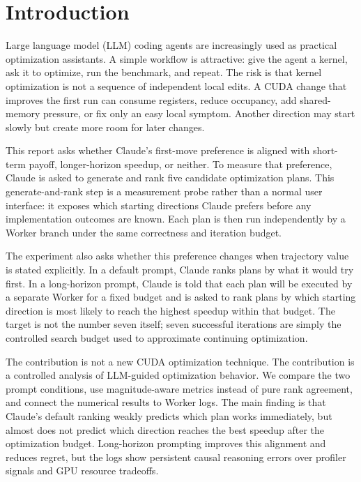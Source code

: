 \documentclass[conference]{IEEEtran}
\begin{document}
\vspace{0.5em}
\noindent{}

\section{Introduction}

Large language model (LLM) coding agents are increasingly used as practical
optimization assistants. A simple workflow is attractive: give the agent a
kernel, ask it to optimize, run the benchmark, and repeat. The risk is that
kernel optimization is not a sequence of independent local edits. A CUDA
change that improves the first run can consume registers, reduce occupancy,
add shared-memory pressure, or fix only an easy local symptom. Another
direction may start slowly but create more room for later changes.

This report asks whether Claude's first-move preference is aligned with
short-term payoff, longer-horizon speedup, or neither. To measure that
preference, Claude is asked to generate and rank five candidate optimization
plans. This generate-and-rank step is a measurement probe rather than a normal
user interface: it exposes which starting directions Claude prefers before any
implementation outcomes are known. Each plan is then run independently by a
Worker branch under the same correctness and iteration budget.

The experiment also asks whether this preference changes when trajectory value
is stated explicitly. In a default prompt, Claude ranks plans by what it would
try first. In a long-horizon prompt, Claude is told that each plan will be
executed by a separate Worker for a fixed budget and is asked to rank plans by
which starting direction is most likely to reach the highest speedup within
that budget. The target is not the number seven itself; seven successful
iterations are simply the controlled search budget used to approximate
continuing optimization.

The contribution is not a new CUDA optimization technique. The contribution is
a controlled analysis of LLM-guided optimization behavior. We compare the two
prompt conditions, use magnitude-aware metrics instead of pure rank agreement,
and connect the numerical results to Worker logs. The main finding is that
Claude's default ranking weakly predicts which plan works immediately, but
almost does not predict which direction reaches the best speedup after the
optimization budget. Long-horizon prompting improves this alignment and
reduces regret, but the logs show persistent causal reasoning errors over
profiler signals and GPU resource tradeoffs.
\end{document}
